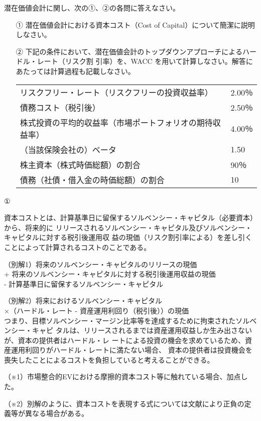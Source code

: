\documentclass[report,gutter=10mm,fore-edge=10mm,uplatex,dvipdfmx]{jlreq}
\begin{document}
潜在価値会計に関し、次の①、②の各問に答えなさい。

\begin{itemize}
\item[①] 潜在価値会計における資本コスト（Cost of Capital）について簡潔に説明しなさい。
\item[②] 下記の条件において、潜在価値会計のトップダウンアプローチによるハードル・レート（リスク割 引率）を、WACC を用いて計算しなさい。解答にあたっては計算過程も記載しなさい。
\begin{tabular}{ll}
リスクフリー・レート（リスクフリーの投資収益率）&2.00％  \\
 債務コスト（税引後）&2.50％\\
 株式投資の平均的収益率（市場ポートフォリオの期待収益率） &4.00％\\
 （当該保険会社の）ベータ&1.50\\
 株主資本（株式時価総額）の割合&90％\\
 債務（社債・借入金の時価総額）の割合&10%
\end{tabular} 
\end{itemize}
\answer{}
①

資本コストとは、計算基準日に留保するソルベンシー・キャピタル（必要資本）から、将来的に
リリースされるソルベンシー・キャピタル及びソルベンシー・キャピタルに対する税引後運用収
益の現価（リスク割引率による）を差し引くことによって計算されるコストのことである。

（別解1）将来のソルベンシー・キャピタルのリリースの現価\\
+ 将来のソルベンシー・キャピタルに対する税引後運用収益の現価\\
- 計算基準日に留保するソルベンシー・キャピタル

（別解2）将来におけるソルベンシー・キャピタル\\
×（ハードル・レート - 資産運用利回り（税引後））の現価\\

つまり、目標ソルベンシー・マージン比率等を達成するために拘束されたソルベンシー・キャピ
タルは、リリースされるまでは資産運用収益しか生み出さないが、資本の提供者はハードル・レ
ートによる投資の機会を求めているため、資産運用利回りがハードル・レートに満たない場合、
資本の提供者は投資機会を喪失したことによるコストを負担していると考えることができる。

（※1）市場整合的EVにおける摩擦的資本コスト等に触れている場合、加点した。

（※2）別解のように、資本コストを表現する式については文献により正負の定義等が異なる場合がある。
\end{document}
